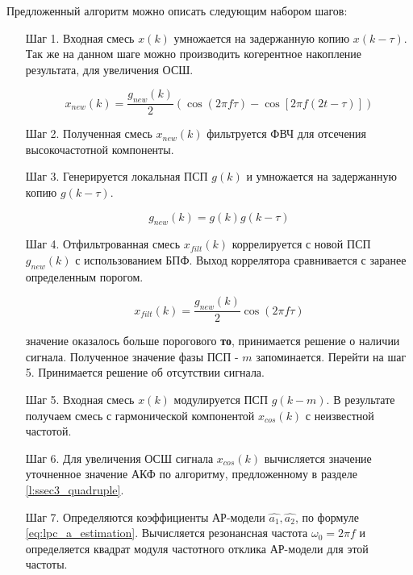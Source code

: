 Предложенный алгоритм можно описать следующим набором шагов:
\begin{itemize}
\item[Шаг 1.] Входная смесь ${x(k)}$ умножается на задержанную копию ${x(k-\tau)}$. Так же
	на данном шаге можно производить когерентное накопление результата, для
	увеличения ОСШ.

	\begin{center}
	\begin{equation}
		x_{new}(k) = \frac{g_{new}(k)}{2} \left(\cos (2\pi f \tau) - \cos \left[2 \pi f (2t - \tau)\right]\right)
	\end{equation}
	\end{center}

\item[Шаг 2.] Полученная смесь ${x_{new}(k)}$ фильтруется ФВЧ для отсечения высокочастотной компоненты.
\item[Шаг 3.] Генерируется локальная ПСП ${g(k)}$ и умножается на задержанную копию ${g(k-\tau)}$.

	\begin{center}
	\begin{equation}
		g_{new}(k) = g(k)g(k-\tau)
	\end{equation}
	\end{center}

\item[Шаг 4.] Отфильтрованная смесь ${x_{filt}(k)}$ коррелируется с новой ПСП ${g_{new}(k)}$
	с использованием БПФ. Выход коррелятора сравнивается с заранее определенным порогом.

	\begin{center}
	\begin{equation}
		x_{filt}(k) = \frac{g_{new}(k)}{2} \cos (2\pi f \tau)
	\end{equation}
	\end{center}

	  значение оказалось больше порогового {\bf{то}},
		принимается решение о наличии сигнала. Полученное значение фазы ПСП  - ${m}$ запоминается.
		Перейти на шаг 5.
		Принимается решение об отсутствии сигнала.
\item[Шаг 5.] Входная смесь ${x(k)}$ модулируется ПСП ${g(k-m)}$. В результате получаем смесь с гармонической компонентой 
	${x_{cos}(k)}$ с неизвестной частотой.
\item[Шаг 6.] Для увеличения ОСШ сигнала ${x_{cos}(k)}$ вычисляется значение уточненное значение АКФ
	по алгоритму, предложенному в разделе \ref{l:ssec3_quadruple}.
\item[Шаг 7.] Определяются коэффициенты АР-модели ${\hat{a_1}, \hat{a_2}}$, по формуле \ref{eq:lpc_a_estimation}. 
	Вычисляется резонансная частота ${\omega_0 = 2 \pi f}$ и определяется квадрат модуля частотного отклика АР-модели для этой частоты. 
\end{itemize}

